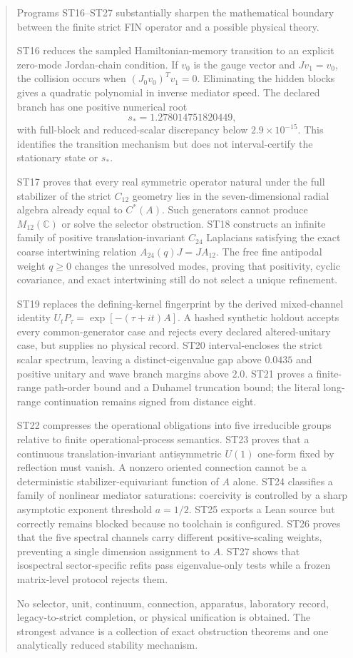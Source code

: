 \documentclass[11pt,a4paper]{article}
\begin{document}
\begin{abstract}
Programs ST16--ST27 substantially sharpen the mathematical boundary between the finite strict FIN operator and a possible physical theory.

ST16 reduces the sampled Hamiltonian-memory transition to an explicit zero-mode Jordan-chain condition. If $v_0$ is the gauge vector and $Jv_1=v_0$, the collision occurs when $(J_0v_0)^Tv_1=0$. Eliminating the hidden blocks gives a quadratic polynomial in inverse mediator speed. The declared branch has one positive numerical root
\[
s_*=1.278014751820449,
\]
with full-block and reduced-scalar discrepancy below $2.9\times10^{-15}$. This identifies the transition mechanism but does not interval-certify the stationary state or $s_*$.

ST17 proves that every real symmetric operator natural under the full stabilizer of the strict $C_{12}$ geometry lies in the seven-dimensional radial algebra already equal to $C^*(A)$. Such generators cannot produce $M_{12}(\mathbb C)$ or solve the selector obstruction. ST18 constructs an infinite family of positive translation-invariant $C_{24}$ Laplacians satisfying the exact coarse intertwining relation $A_{24}(q)J=JA_{12}$. The free fine antipodal weight $q\ge0$ changes the unresolved modes, proving that positivity, cyclic covariance, and exact intertwining still do not select a unique refinement.

ST19 replaces the defining-kernel fingerprint by the derived mixed-channel identity $U_tP_\tau=\exp[-(\tau+it)A]$. A hashed synthetic holdout accepts every common-generator case and rejects every declared altered-unitary case, but supplies no physical record. ST20 interval-encloses the strict scalar spectrum, leaving a distinct-eigenvalue gap above $0.0435$ and positive unitary and wave branch margins above $2.0$. ST21 proves a finite-range path-order bound and a Duhamel truncation bound; the literal long-range continuation remains signed from distance eight.

ST22 compresses the operational obligations into five irreducible groups relative to finite operational-process semantics. ST23 proves that a continuous translation-invariant antisymmetric $U(1)$ one-form fixed by reflection must vanish. A nonzero oriented connection cannot be a deterministic stabilizer-equivariant function of $A$ alone. ST24 classifies a family of nonlinear mediator saturations: coercivity is controlled by a sharp asymptotic exponent threshold $a=1/2$. ST25 exports a Lean source but correctly remains blocked because no toolchain is configured. ST26 proves that the five spectral channels carry different positive-scaling weights, preventing a single dimension assignment to $A$. ST27 shows that isospectral sector-specific refits pass eigenvalue-only tests while a frozen matrix-level protocol rejects them.

No selector, unit, continuum, connection, apparatus, laboratory record, legacy-to-strict completion, or physical unification is obtained. The strongest advance is a collection of exact obstruction theorems and one analytically reduced stability mechanism.
\end{abstract}
\end{document}
